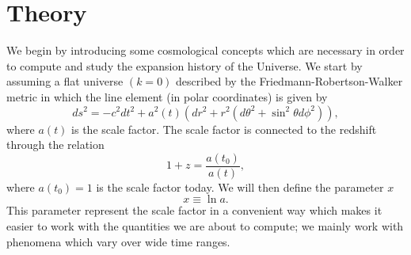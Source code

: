 \documentclass[a4paper, 10pt, reqno]{amsart}
\begin{document}
\section{Theory}
We begin by introducing some cosmological concepts which are necessary
in order to compute and study the expansion history of the Universe. We
start by assuming a flat universe $(k=0)$ described by the
Friedmann-Robertson-Walker metric in which the line element (in polar
coordinates) is given by
\begin{equation}\label{eq: ds}
    ds^2 = -c^2 dt^2 + a^2(t) \left( dr^2 + r^2(d\theta^2 + \sin^2
    \theta d\phi^2) \right),
\end{equation}
where $a(t)$ is the scale factor. The scale factor is connected to the
redshift through the relation
\begin{equation}\label{eq: redshift}
    1 + z = \frac{a(t_0)}{a(t)},
\end{equation}
where $a(t_0) = 1$ is the scale factor today. We will then define the
parameter $x$
\begin{equation}\label{eq: x}
    x \equiv \ln a.
\end{equation}
This parameter represent the scale factor in a convenient way which makes it easier to work with the quantities we are about to compute;
we mainly work with phenomena which vary over wide time
ranges. 
\end{document}
